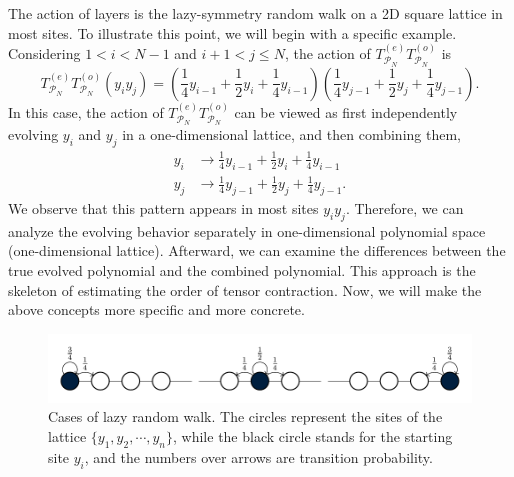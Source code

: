 \documentclass{article}
\begin{document}
\newcommand{\teto}{T^{(e)}_{\mathcal{P}_N}T^{(o)}_{\mathcal{P}_N}}
The action of layers is the lazy-symmetry random walk on a 2D square lattice in most sites. To illustrate this point, we will begin with a specific example. Considering $1<i<N-1$ and $i+1<j\leq N$, the action of $\teto$ is
\begin{equation}
    \label{eq: zz anonymous 5}
    \teto (y_iy_j) = \left(\frac{1}{4} y_{i-1} + \frac{1}{2}y_i + \frac{1}{4} y_{i-1}\right)\left( \frac{1}{4} y_{j-1} + \frac{1}{2}y_j + \frac{1}{4} y_{j-1} \right).
\end{equation}
In this case, the action of $\teto$ can be viewed as first independently evolving $y_i$ and $y_j$ in a one-dimensional lattice, and then combining them,
\begin{equation}
\label{eq: separate evolution}
    \begin{aligned}
        y_i &\to \frac{1}{4} y_{i-1} + \frac{1}{2}y_i + \frac{1}{4} y_{i-1}\\
    y_j &\to \frac{1}{4} y_{j-1} + \frac{1}{2}y_j + \frac{1}{4} y_{j-1}.
    \end{aligned}
\end{equation}
We observe that this pattern appears in most sites $y_iy_j$. Therefore, we can analyze the evolving behavior separately in one-dimensional polynomial space (one-dimensional lattice). Afterward, we can examine the differences between the true evolved polynomial and the combined polynomial. This approach is the skeleton of estimating the order of tensor contraction. Now, we will make the above concepts more specific and more concrete.

\begin{figure}
    \centering
    \includegraphics[width=0.95\linewidth]{figures/appendix/lazzy_symmetry_random_walk.pdf}
    \caption{Cases of lazy random walk. The circles represent the sites of the lattice $\{y_1, y_2, \cdots, y_n\}$, while the black circle stands for the starting site $y_i$, and the numbers over arrows are transition probability.}
    \label{fig: lazy random walk}
\end{figure}
\end{document}
